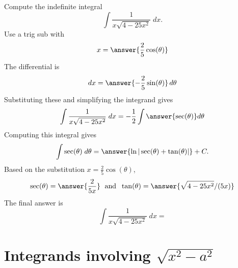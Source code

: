 \documentclass{ximera}
\begin{document}
\begin{problem}

Compute the indefinite integral
\[
\int \frac{1}{x\sqrt{4-25x^2}}  \; dx.
\]
Use a trig sub with\\
\[
x = \answer{\frac25\cos(\theta)}
\]
The differential is\\
\[
dx = \answer{-\frac25\sin(\theta)}\,d\theta
\]
Substituting these and simplifying the integrand gives\\
\[
\int \frac{1}{x\sqrt{4-25x^2}}  \; dx = -\frac12\int \answer{\sec(\theta)} d\theta
\]
Computing this integral gives
\[
\int \sec(\theta) \; d\theta = \answer{\ln|\sec(\theta) + \tan(\theta)|} + C.
\]
Based on the substitution $x = \frac25 \cos(\theta)$, \\
\[
\sec(\theta) = \answer{\frac{2}{5x}} \; \text{ and } \; \tan(\theta) = \answer{\sqrt{4-25x^2}/(5x)}
\]
The final answer is
\[
\int  \frac{1}{x\sqrt{4-25x^2}} \; dx = 
\]
\begin{center}
\begin{multipleChoice}
\end{multipleChoice}
\end{center}


\end{problem}

















\section{Integrands involving $\sqrt{x^2 - a^2}$}
\end{document}
